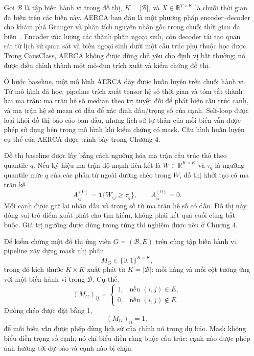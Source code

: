 Gọi \(\mathcal{B}\) là tập biến hành vi trong đồ thị, \(K=|\mathcal{B}|\), và \(X\in\mathbb{R}^{T\times K}\) là chuỗi thời gian đa biến trên các biến này. AERCA ban đầu là một phương pháp encoder--decoder cho khám phá Granger và phân tích nguyên nhân gốc trong chuỗi thời gian đa biến \,\cite{han2025aerca}. Encoder ước lượng các thành phần ngoại sinh, còn decoder tái tạo quan sát từ lịch sử quan sát và biến ngoại sinh dưới một cấu trúc phụ thuộc học được. Trong CausClass, AERCA không được dùng chủ yếu cho định vị bất thường; nó được điều chỉnh thành một mô-đun trích xuất và kiểm chứng đồ thị.

Ở bước baseline, một mô hình AERCA dày được huấn luyện trên chuỗi hành vi. Từ mô hình đã học, pipeline trích xuất tensor hệ số thời gian và tóm tắt thành hai ma trận: ma trận hệ số median theo trị tuyệt đối để phát hiện cấu trúc cạnh, và ma trận hệ số mean có dấu để xác định dấu/trọng số của cạnh. Self-loop được loại khỏi đồ thị báo cáo ban đầu, nhưng lịch sử tự thân của mỗi biến vẫn được phép sử dụng bên trong mô hình khi kiểm chứng có mask. Cấu hình huấn luyện cụ thể của AERCA được trình bày trong Chương 4.

Đồ thị baseline được lấy bằng cách ngưỡng hóa ma trận cấu trúc thô theo quantile \(q\). Nếu ký hiệu ma trận độ mạnh liên kết là \(W\in\mathbb{R}^{K\times K}\) và \(\tau_q\) là ngưỡng quantile mức \(q\) của các phần tử ngoài đường chéo trong \(W\), đồ thị khởi tạo có ma trận kề
\begin{equation}
\label{eq:aerca-initial-adjacency}
    A^{(0)}_{ij}=\mathbf{1}\{W_{ij}\geq \tau_q\}, \qquad A^{(0)}_{ii}=0.
\end{equation}
Mỗi cạnh được giữ lại nhận dấu và trọng số từ ma trận hệ số có dấu. Đồ thị này đóng vai trò điểm xuất phát cho tìm kiếm, không phải kết quả cuối cùng bắt buộc. Giá trị ngưỡng được dùng trong từng thí nghiệm được nêu ở Chương 4.

Để kiểm chứng một đồ thị ứng viên \(G=(\mathcal{B},E)\) trên cùng tập biến hành vi, pipeline xây dựng mask nhị phân
\begin{equation}
\label{eq:graph-mask-space}
    M_G\in\{0,1\}^{K\times K},
\end{equation}
trong đó kích thước \(K\times K\) xuất phát từ \(K=|\mathcal{B}|\): mỗi hàng và mỗi cột tương ứng với một biến hành vi trong \(\mathcal{B}\). Cụ thể,
\begin{equation}
\label{eq:graph-mask-definition}
    (M_G)_{ij}=\begin{cases}
        1, & \text{nếu } (i,j)\in E,\\
        0, & \text{nếu } (i,j)\notin E.
    \end{cases}
\end{equation}
Đường chéo được đặt bằng 1,
\begin{equation}
\label{eq:self-connection-mask}
    (M_G)_{ii}=1,
\end{equation}
để mỗi biến vẫn được phép dùng lịch sử của chính nó trong dự báo. Mask không biểu diễn trọng số cạnh; nó chỉ biểu diễn ràng buộc cấu trúc: cạnh nào được phép ảnh hưởng tới dự báo và cạnh nào bị chặn.

